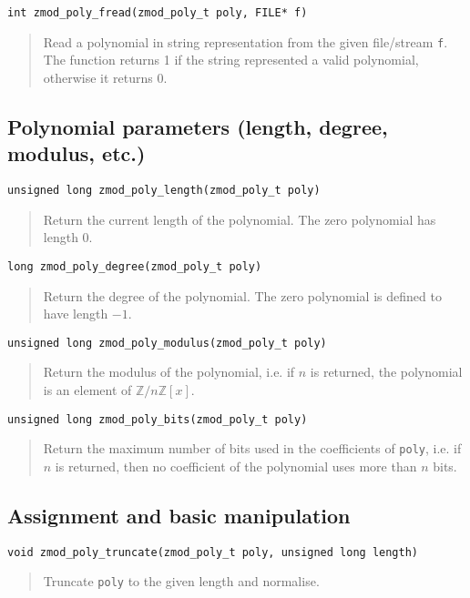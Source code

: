 \documentclass[a4paper,10pt]{article}
\newcommand{\Z}{\mathbb{Z}}
\newcommand{\code}{\lstinline}
\begin{document}
\begin{lstlisting}
int zmod_poly_fread(zmod_poly_t poly, FILE* f)
\end{lstlisting}
\begin{quote}
Read a polynomial in string representation from the given file/stream \code{f}. The function returns 1 if the string represented a valid polynomial, otherwise it returns 0.
\end{quote}

\subsection{Polynomial parameters (length, degree, modulus, etc.)}
\begin{lstlisting}
unsigned long zmod_poly_length(zmod_poly_t poly)
\end{lstlisting}
\begin{quote}
Return the current length of the polynomial. The zero polynomial has length 0.
\end{quote}

\begin{lstlisting}
long zmod_poly_degree(zmod_poly_t poly)
\end{lstlisting}
\begin{quote}
Return the degree of the polynomial. The zero polynomial is defined to have length $-1$.
\end{quote}

\begin{lstlisting}
unsigned long zmod_poly_modulus(zmod_poly_t poly)
\end{lstlisting}
\begin{quote}
Return the modulus of the polynomial, i.e. if $n$ is returned, the polynomial is an element of $\Z/n\Z[x]$.\end{quote}

\begin{lstlisting}
unsigned long zmod_poly_bits(zmod_poly_t poly)
\end{lstlisting}
\begin{quote}
Return the maximum number of bits used in the coefficients of \code{poly}, i.e. if $n$ is returned, then no coefficient of the polynomial uses more than $n$ bits.\end{quote}

\subsection{Assignment and basic manipulation}
\begin{lstlisting}
void zmod_poly_truncate(zmod_poly_t poly, unsigned long length)
\end{lstlisting}
\begin{quote}
Truncate \code{poly} to the given length and normalise.
\end{quote}
\end{document}
